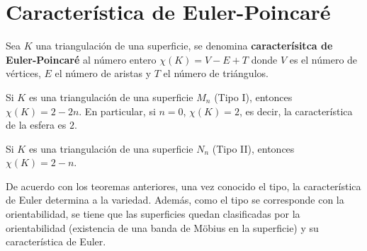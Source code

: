 \documentclass[GTSResumen.tex]{subfiles}
\begin{document}
\begin{comment}
\end{enumerate}
Esto termina la demostración. $\QED$
\end{comment}




\section{Característica de Euler-Poincaré}

\begin{defi} Sea $K$ una triangulación de una superficie, se denomina \textbf{caracterísitca de Euler-Poincaré} al número entero $\chi(K)=V-E+T$  %
donde $V$ es el número de vértices, $E$ el número de aristas y $T$ el número de triángulos. %
\end{defi}

\begin{teorema}
Si $K$ es una triangulación de una superficie $M_n$ (Tipo I), entonces $\chi(K)=2-2n$. En particular, si $n=0$, $\chi(K)=2$, es decir, la característica de la esfera es $2$.
\end{teorema}

\begin{teorema}\label{542}
Si $K$ es una triangulación de una superficie $N_n$ (Tipo II), entonces $\chi(K)=2-n$.
\end{teorema}


\begin{nota} De acuerdo con los teoremas anteriores, una vez conocido el tipo, la característica de Euler determina a la variedad. Además, como el tipo se corresponde con la orientabilidad, se tiene que las superficies quedan clasificadas por la orientabilidad (existencia de una banda de Möbius en la superficie) y su característica de Euler. 
\end{nota}
\end{document}

